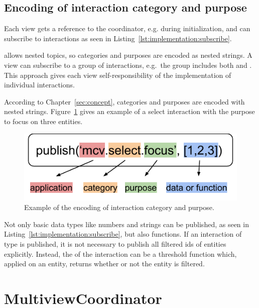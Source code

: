 \subsection{Encoding of interaction category and purpose}
Each view gets a reference to the coordinator, e.g. during initialization, and can subscribe to interactions as seen in Listing~\ref{lst:implementation:subscribe}.

 allows nested topics, so categories and purposes are encoded as nested strings.
A view can subscribe to a group of interactions, e.g.\ the group  includes both  and .
This approach gives each view self-responsibility of the implementation of individual interactions.

According to Chapter~\ref{sec:concept}, categories and purposes are encoded with nested strings.
Figure~\ref{fig:implementation:encoding} gives an example of a select interaction with the purpose to focus on three entities.

\begin{figure}[ht]
  \centering
  \caption{%
    Example of the encoding of interaction category and purpose.
  }\label{fig:implementation:encoding}
  \includegraphics[width=\textwidth]{figures/implementation/Encoding}
\end{figure}

Not only basic data types like numbers and strings can be published, as seen in Listing~\ref{lst:implementation:subscribe}, but also functions.
If an interaction of type  is published, it is not necessary to publish all filtered ids of entities explicitly.
Instead, the  of the interaction can be a threshold function which, applied on an entity, returns whether or not the entity is filtered.




\section{MultiviewCoordinator}

